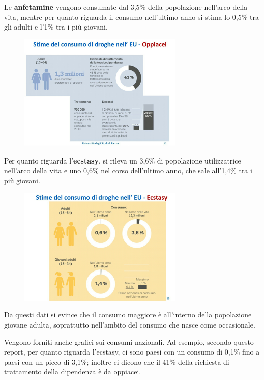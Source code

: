 Le \textbf{anfetamine} vengono
consumate dal 3,5\% della popolazione nell'arco della vita, mentre per
quanto riguarda il consumo nell'ultimo anno si stima lo 0,5\% tra gli
adulti e l'1\% tra i più giovani.

\begin{figure}[!ht]
\centering
	\includegraphics[width=0.7\textwidth]{18/image5.jpeg}
\end{figure}

Per quanto riguarda
l'\textbf{ecstasy}, si rileva un 3,6\% di popolazione utilizzatrice
nell'arco della vita e uno 0,6\% nel corso dell'ultimo anno, che sale
all'1,4\% tra i più giovani.

\begin{figure}[!ht]
\centering
	\includegraphics[width=0.7\textwidth]{18/image6.jpeg}
\end{figure}

Da questi dati si evince che il consumo maggiore è all'interno della
popolazione giovane adulta, soprattutto nell'ambito del consumo che
nasce come occasionale.

Vengono forniti anche grafici sui consumi nazionali. Ad esempio, secondo
questo report, per quanto riguarda l'ecstasy, ci sono paesi con un
consumo di 0,1\% fino a paesi con un picco di 3,1\%; inoltre ci dicono
che il 41\% della richiesta di trattamento della dipendenza è da
oppiacei.

